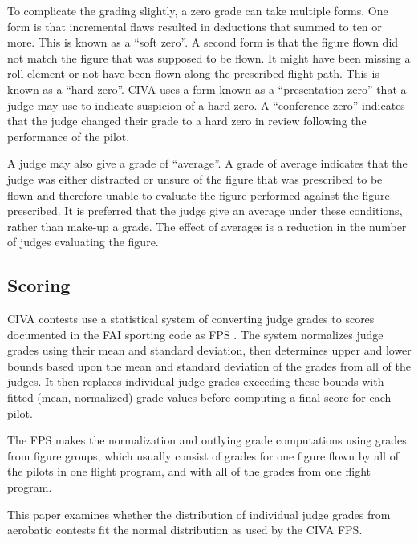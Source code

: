 To complicate the grading slightly, a zero grade can take multiple forms.
One form is that incremental flaws resulted in deductions that summed to
ten or more. This is known as a ``soft zero''. A second form is that the
figure flown did not match the figure that was supposed to be flown.
It might have been missing a roll element or not have been flown along
the prescribed flight path. This is known as a ``hard zero''. CIVA uses
a form known as a ``presentation zero'' that a judge may use to indicate
suspicion of a hard zero. A ``conference zero'' indicates that the judge
changed their grade to a hard zero in review following the performance
of the pilot.

A judge may also give a grade of ``average''. A grade of average indicates
that the judge was either distracted or unsure of the figure that was
prescribed to be flown and therefore unable to evaluate the figure performed
against the figure prescribed. It is preferred that the judge give an
average under these conditions, rather than make-up a grade.
The effect of averages is a reduction in the number of judges evaluating
the figure.

\subsection{Scoring}

CIVA contests use a statistical system of converting judge grades to scores
documented in the FAI sporting code as FPS \cite{fps}.
The system normalizes judge grades using their mean and standard deviation,
then determines upper and lower bounds based upon the mean and standard
deviation of the grades from all of the judges. It then replaces
individual judge grades exceeding these bounds with fitted (mean, normalized)
grade values before computing a final score for each pilot.

The FPS makes the normalization and outlying grade computations using
grades from figure groups, which usually consist of grades for
one figure flown by all of the pilots in one flight program, and with all
of the grades from one flight program.

This paper examines whether the distribution of individual judge grades from
aerobatic contests fit the normal distribution as used by the CIVA FPS.
